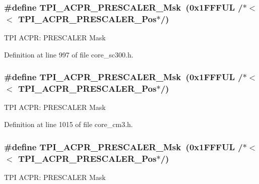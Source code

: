 \subsubsection[{\texorpdfstring{T\+P\+I\+\_\+\+A\+C\+P\+R\+\_\+\+P\+R\+E\+S\+C\+A\+L\+E\+R\+\_\+\+Msk}{TPI_ACPR_PRESCALER_Msk}}]{\setlength{\rightskip}{0pt plus 5cm}\#define T\+P\+I\+\_\+\+A\+C\+P\+R\+\_\+\+P\+R\+E\+S\+C\+A\+L\+E\+R\+\_\+\+Msk~(0x1\+F\+F\+F\+U\+L /$\ast$$<$$<$ T\+P\+I\+\_\+\+A\+C\+P\+R\+\_\+\+P\+R\+E\+S\+C\+A\+L\+E\+R\+\_\+\+Pos$\ast$/)}\hypertarget{group___c_m_s_i_s___t_p_i_ga4fcacd27208419929921aec8457a8c13}{}\label{group___c_m_s_i_s___t_p_i_ga4fcacd27208419929921aec8457a8c13}
T\+PI A\+C\+PR\+: P\+R\+E\+S\+C\+A\+L\+ER Mask 

Definition at line 997 of file core\+\_\+sc300.\+h.

\subsubsection[{\texorpdfstring{T\+P\+I\+\_\+\+A\+C\+P\+R\+\_\+\+P\+R\+E\+S\+C\+A\+L\+E\+R\+\_\+\+Msk}{TPI_ACPR_PRESCALER_Msk}}]{\setlength{\rightskip}{0pt plus 5cm}\#define T\+P\+I\+\_\+\+A\+C\+P\+R\+\_\+\+P\+R\+E\+S\+C\+A\+L\+E\+R\+\_\+\+Msk~(0x1\+F\+F\+F\+U\+L /$\ast$$<$$<$ T\+P\+I\+\_\+\+A\+C\+P\+R\+\_\+\+P\+R\+E\+S\+C\+A\+L\+E\+R\+\_\+\+Pos$\ast$/)}\hypertarget{group___c_m_s_i_s___t_p_i_ga4fcacd27208419929921aec8457a8c13}{}\label{group___c_m_s_i_s___t_p_i_ga4fcacd27208419929921aec8457a8c13}
T\+PI A\+C\+PR\+: P\+R\+E\+S\+C\+A\+L\+ER Mask 

Definition at line 1015 of file core\+\_\+cm3.\+h.

\subsubsection[{\texorpdfstring{T\+P\+I\+\_\+\+A\+C\+P\+R\+\_\+\+P\+R\+E\+S\+C\+A\+L\+E\+R\+\_\+\+Msk}{TPI_ACPR_PRESCALER_Msk}}]{\setlength{\rightskip}{0pt plus 5cm}\#define T\+P\+I\+\_\+\+A\+C\+P\+R\+\_\+\+P\+R\+E\+S\+C\+A\+L\+E\+R\+\_\+\+Msk~(0x1\+F\+F\+F\+U\+L /$\ast$$<$$<$ T\+P\+I\+\_\+\+A\+C\+P\+R\+\_\+\+P\+R\+E\+S\+C\+A\+L\+E\+R\+\_\+\+Pos$\ast$/)}\hypertarget{group___c_m_s_i_s___t_p_i_ga4fcacd27208419929921aec8457a8c13}{}\label{group___c_m_s_i_s___t_p_i_ga4fcacd27208419929921aec8457a8c13}
T\+PI A\+C\+PR\+: P\+R\+E\+S\+C\+A\+L\+ER Mask 

